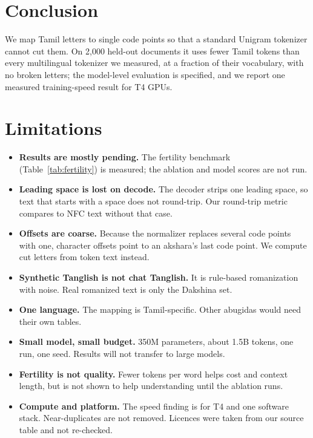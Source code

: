 \documentclass[11pt]{article}
\begin{document}
\section{Conclusion}
We map Tamil letters to single code points so that a standard Unigram tokenizer cannot cut them.
On 2,000 held-out documents it uses fewer Tamil tokens than every multilingual tokenizer we measured, at a fraction of their vocabulary, with no broken letters; the model-level evaluation is specified, and we report one measured training-speed result for T4 GPUs.

\section*{Limitations}
\begin{itemize}
\item \textbf{Results are mostly pending.} The fertility benchmark (Table~\ref{tab:fertility}) is measured; the ablation and model scores are not run.
\item \textbf{Leading space is lost on decode.} The decoder strips one leading space, so text that starts with a space does not round-trip. Our round-trip metric compares to NFC text without that case.
\item \textbf{Offsets are coarse.} Because the normalizer replaces several code points with one, character offsets point to an akshara's last code point. We compute cut letters from token text instead.
\item \textbf{Synthetic Tanglish is not chat Tanglish.} It is rule-based romanization with noise. Real romanized text is only the Dakshina set.
\item \textbf{One language.} The mapping is Tamil-specific. Other abugidas would need their own tables.
\item \textbf{Small model, small budget.} 350M parameters, about 1.5B tokens, one run, one seed. Results will not transfer to large models.
\item \textbf{Fertility is not quality.} Fewer tokens per word helps cost and context length, but is not shown to help understanding until the ablation runs.
\item \textbf{Compute and platform.} The speed finding is for T4 and one software stack. Near-duplicates are not removed. Licences were taken from our source table and not re-checked.
\end{itemize}
\end{document}
